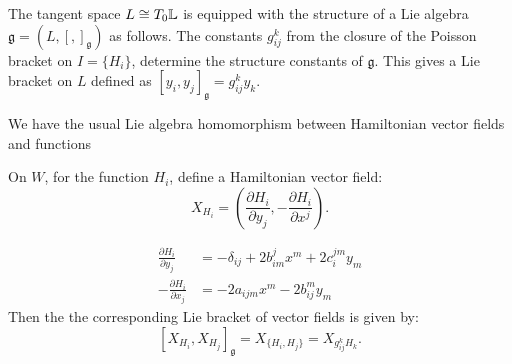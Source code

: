     The tangent space \( L \cong T_0\mathbb{L}\) is equipped with the structure of a Lie algebra \( \mathfrak{g} = (L, [, ]_{\mathfrak{g}}) \) as follows. The constants \(g_{ij}^k\) from the closure of the Poisson bracket on \(I = \{ H_i\}\), determine the structure constants of \( \mathfrak{g}\). This gives a Lie bracket on \( L\) defined as \( [y_i,y_j]_{\mathfrak{g}} =g_{ij}^k y_k\). 

    
    We have the usual Lie algebra homomorphism between Hamiltonian vector fields and functions 
    
    On \(W\), for the function \(H_i\), define a Hamiltonian vector field:
    \[ X_{H_i} = \left( \frac{\partial H_i}{\partial y_j}, - \frac{\partial H_i}{\partial x^j} \right). \]

    \begin{align*}
    \frac{\partial H_i}{\partial y_j} &= - \delta_{ij} + 2 b_{im}^j x^m + 2 c_{i}^{j m} y_m \\
    -\frac{\partial H_i}{\partial x_j} &= -2 a_{ijm}x^m - 2 b_{ij}^m y_m
    \end{align*}
    Then the the corresponding Lie bracket of vector fields is given by:
    \[ [X_{H_i}, X_{H_j} ]_{\mathfrak{g}} = X_{\{H_i,H_j\}} = X_{g_{ij}^k H_k}. \]
    
    
    
    
